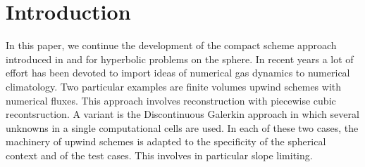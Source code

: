
\section{Introduction}
\label{sec:1}
In this paper, we continue the development
of the compact scheme approach introduced in \cite{} and \cite{}
for hyperbolic problems on the sphere.
In recent years a lot of effort
has been devoted to import
ideas of numerical gas dynamics to numerical climatology.
Two particular examples are finite volumes upwind schemes 
with numerical fluxes. This approach involves
reconstruction with piecewise cubic recontsruction.
A variant is the Discontinuous Galerkin approach
in which several unknowns in a single computational cells are used.
In each of these two cases, the machinery of upwind schemes is adapted
to the specificity of the spherical context
and of the test cases. This involves in particular 
slope limiting. 

